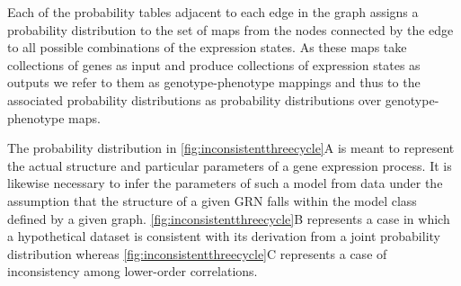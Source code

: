 Each of the probability tables adjacent to each edge in the graph assigns a probability distribution to the set of maps from the nodes connected by the edge to all possible combinations of the expression states. As these maps take collections of genes as input and produce collections of expression states as outputs we refer to them as genotype-phenotype mappings and thus to the associated probability distributions as probability distributions over genotype-phenotype maps.

The probability distribution in \ref{fig:inconsistentthreecycle}A is meant to represent the actual structure and particular parameters of a gene expression process. It is likewise necessary to infer the parameters of such a model from data under the assumption that the structure of a given GRN falls within the model class defined by a given graph. \ref{fig:inconsistentthreecycle}B represents a case in which a hypothetical dataset is consistent with its derivation from a joint probability distribution whereas \ref{fig:inconsistentthreecycle}C represents a case of inconsistency among lower-order correlations.
